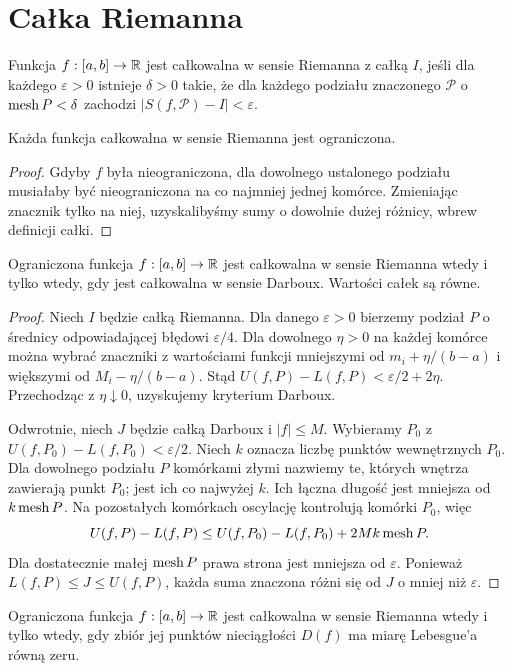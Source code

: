 \section{Całka Riemanna}
\begin{definicja}
Funkcja $f:[a,b]\to\mathbb R$ jest całkowalna w sensie Riemanna z całką $I$, jeśli dla każdego $\varepsilon>0$ istnieje $\delta>0$ takie, że dla każdego podziału znaczonego $\mathcal P$ o $\operatorname{mesh} P<\delta$ zachodzi $|S(f,\mathcal P)-I|<\varepsilon$.
\end{definicja}
\begin{stwierdzenie}
Każda funkcja całkowalna w sensie Riemanna jest ograniczona.
\end{stwierdzenie}
\begin{proof}
Gdyby $f$ była nieograniczona, dla dowolnego ustalonego podziału musiałaby być nieograniczona na co najmniej jednej komórce. Zmieniając znacznik tylko na niej, uzyskalibyśmy sumy o dowolnie dużej różnicy, wbrew definicji całki.
\end{proof}
\begin{twierdzenie}[Darboux]
Ograniczona funkcja $f:[a,b]\to\mathbb R$ jest całkowalna w sensie Riemanna wtedy i tylko wtedy, gdy jest całkowalna w sensie Darboux. Wartości całek są równe.
\end{twierdzenie}
\begin{proof}
Niech $I$ będzie całką Riemanna. Dla danego $\varepsilon>0$ bierzemy podział $P$ o średnicy odpowiadającej błędowi $\varepsilon/4$. Dla dowolnego $\eta>0$ na każdej komórce można wybrać znaczniki z wartościami funkcji mniejszymi od $m_i+\eta/(b-a)$ i większymi od $M_i-\eta/(b-a)$. Stąd $U(f,P)-L(f,P)<\varepsilon/2+2\eta$. Przechodząc z $\eta\downarrow0$, uzyskujemy kryterium Darboux.

Odwrotnie, niech $J$ będzie całką Darboux i $|f|\le M$. Wybieramy $P_0$ z $U(f,P_0)-L(f,P_0)<\varepsilon/2$. Niech $k$ oznacza liczbę punktów wewnętrznych $P_0$. Dla dowolnego podziału $P$ komórkami złymi nazwiemy te, których wnętrza zawierają punkt $P_0$; jest ich co najwyżej $k$. Ich łączna długość jest mniejsza od $k\operatorname{mesh} P$. Na pozostałych komórkach oscylację kontrolują komórki $P_0$, więc
\[
U(f,P)-L(f,P)\le U(f,P_0)-L(f,P_0)+2Mk\operatorname{mesh} P.
\]
Dla dostatecznie małej $\operatorname{mesh} P$ prawa strona jest mniejsza od $\varepsilon$. Ponieważ $L(f,P)\le J\le U(f,P)$, każda suma znaczona różni się od $J$ o mniej niż $\varepsilon$.
\end{proof}
\begin{twierdzenie}
Ograniczona funkcja $f:[a,b]\to\mathbb R$ jest całkowalna w sensie Riemanna wtedy i tylko wtedy, gdy zbiór jej punktów nieciągłości $D(f)$ ma miarę Lebesgue'a równą zeru.
\end{twierdzenie}
